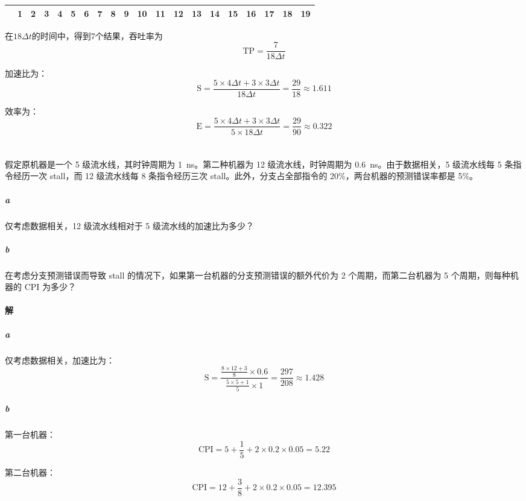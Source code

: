 \documentclass{article}
\begin{document}
\begin{table}[H]
{\begin{tabular}{|c|c|c|c|c|c|c|c|c|c|c|c|c|c|c|c|c|c|c|c|}
              & 1                        & 2                        & 3                        & 4                        & 5                        & 6                        & 7                        & 8                        & 9                        & 10                       & 11                       & 12                       & 13                       & 14                       & 15                       & 16                       & 17                       & 18                       & 19 \\ \hline
            \end{tabular}
    }
\end{table}
在$18\Delta t$的时间中，得到7个结果，吞吐率为
\begin{equation*}
    \text{TP} = \frac{7}{18\Delta t}
\end{equation*}

加速比为：
\begin{equation*}
    \text{S} = \frac{5 \times 4\Delta t + 3 \times 3 \Delta t}{18 \Delta t} = \frac{29}{18} \approx 1.611
\end{equation*}

效率为：
\begin{equation*}
    \text{E} = \frac{5 \times 4\Delta t + 3 \times 3\Delta t}{5 \times 18\Delta t} = \frac{29}{90} \approx 0.322
\end{equation*}


\section{}
假定原机器是一个 5 级流水线，其时钟周期为 \SI{1}{\nano\second}。第二种机器为 12 级流水线，时钟周期为 \SI{0.6}{\nano\second}。由于数据相关，5 级流水线每 5 条指令经历一次 stall，而 12 级流水线每 8 条指令经历三次 stall。此外，分支占全部指令的 20\%，两台机器的预测错误率都是 5\%。
\subparagraph{a} 仅考虑数据相关，12 级流水线相对于 5 级流水线的加速比为多少？
\subparagraph{b} 在考虑分支预测错误而导致 stall 的情况下，如果第一台机器的分支预测错误的额外代价为 2 个周期，而第二台机器为 5 个周期，则每种机器的 CPI 为多少？

\paragraph{解}
\subparagraph{a}
仅考虑数据相关，加速比为：
\begin{equation*}
    \text{S} = \frac{\frac{8 \times 12 + 3}{8} \times 0.6}{\frac{5 \times 5 + 1}{5} \times 1} = \frac{297}{208} \approx 1.428
\end{equation*}

\subparagraph{b}
第一台机器：
\begin{equation*}
    \text{CPI} = 5 + \frac{1}{5} + 2 \times 0.2 \times 0.05 = 5.22
\end{equation*}

第二台机器：
\begin{equation*}
    \text{CPI} = 12 + \frac{3}{8} + 2 \times 0.2 \times 0.05 = 12.395
\end{equation*}
\end{document}
